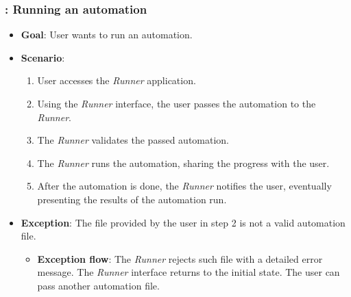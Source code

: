 \subsubsection*{\usecase: Running an automation}
\begin{itemize}
    \item \textbf{Goal}: User wants to run an automation.
    \item \textbf{Scenario}: 
    \begin{enumerate}[label=\arabic*.]
        \item User accesses the \textit{Runner} application.
        \item Using the \textit{Runner} interface, the user passes the automation to the \textit{Runner}.
        \item The \textit{Runner} validates the passed automation.
        \item The \textit{Runner} runs the automation, sharing the progress with the user.
        \item After the automation is done, the \textit{Runner} notifies the user, eventually presenting the results of the automation run.
    \end{enumerate}
    \item \textbf{Exception}: The file provided by the user in step 2 is not a valid automation file.
    \begin{itemize}
        \item \textbf{Exception flow}: The \textit{Runner} rejects such file with a detailed error message. 
        The \textit{Runner} interface returns to the initial state. The user can pass another automation file.
    \end{itemize}
\end{itemize}

